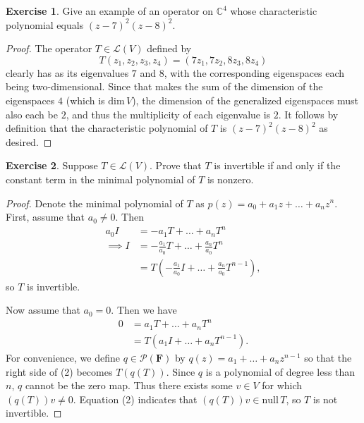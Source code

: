 \documentclass{article}
\theoremstyle{definition}
\newtheorem{ex}{Exercise}
\begin{document}
\begin{ex}
	Give an example of an operator on $\mathbb{C}^4$ whose characteristic polynomial equals $(z - 7)^2(z - 8)^2$.
\end{ex}
\begin{proof}
	The operator $T \in \mathcal{L}(V)$ defined by \begin{equation*}
		T(z_1, z_2, z_3, z_4) = (7z_1, 7z_2, 8z_3, 8z_4)
	\end{equation*} clearly has as its eigenvalues $7$ and $8$, with the corresponding eigenspaces each being two-dimensional.
	Since that makes the sum of the dimension of the eigenspaces $4$ (which is $\mathrm{dim}\,V$), the dimension of the generalized eigenspaces must also each be $2$, and thus the multiplicity of each eigenvalue is $2$.
	It follows by definition that the characteristic polynomial of $T$ is $(z - 7)^2(z -8)^2$ as desired.
\end{proof}

\setcounter{ex}{7}

\begin{ex}
	Suppose $T \in \mathcal{L}(V)$. Prove that $T$ is invertible if and only if the constant term in the minimal polynomial of $T$ is nonzero.
\end{ex}
\begin{proof}
	Denote the minimal polynomial of $T$ as $p(z) = a_0 + a_1z + \dots + a_nz^n$.
	First, assume that $a_0 \neq 0$.
	Then \begin{align*}
		a_0      I & = -a_1T + \dots + a_nT^n                                   \\
		\implies I & = -\frac{a_1}{a_0}T + \dots + \frac{a_n}{a_0}T^n           \\
		           & = T(-\frac{a_1}{a_0}I + \dots + \frac{a_n}{a_0}T^{n - 1}),
	\end{align*} so $T$ is invertible.

	Now assume that $a_0 = 0$. Then we have \begin{align}
		0 & = a_1T + \dots + a_nT^n           \\
		  & = T(a_1I + \dots + a_nT^{n - 1}).
	\end{align}
  For convenience, we define $q \in \mathcal{P}(\mathbf{F})$ by $q(z) = a_1 + \dots + a_nz^{n - 1}$ so that the right side of (2) becomes $T(q(T))$.
	Since $q$ is a polynomial of degree less than $n $, $q$ cannot be the zero map.
  Thus there exists some $v \in V$ for which $(q(T))v \neq 0$.
  Equation (2) indicates that $(q(T))v \in \mathrm{null}\,T$, so $T$ is not invertible.
\end{proof}
\end{document}
